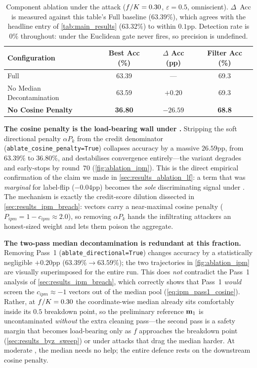 \documentclass[../main.tex]{subfiles}
\begin{document}
\begin{table}[htbp]
\centering
\caption[Component ablation under the \ipm{} attack ($f/\nclients=0.30$, $\varepsilon=0.5$)]{Component ablation under the \ipm{} attack ($f/\nclients=0.30$, $\varepsilon=0.5$, omniscient). $\Delta$~Acc is measured against this table's Full \aegis{} baseline ($63.39\%$), which agrees with the headline \ipm{} entry of \cref{tab:main_results} ($63.32\%$) to within $0.1$pp. Detection rate is $0\%$ throughout: under \ipm{} the Euclidean gate never fires, so precision is undefined.}
\label{tab:ablation_ipm}
\begin{tabular}{lccc}
\toprule
\textbf{Configuration} & \textbf{Best Acc (\%)} & \textbf{$\Delta$ Acc (pp)} & \textbf{Filter Acc (\%)} \\
\midrule
Full \aegis{}             & 63.39 & ---     & 69.3 \\
No Median Decontamination & 63.59 & $+0.20$ & 69.3 \\
\textbf{No Cosine Penalty} & \textbf{36.80} & $\mathbf{-26.59}$ & \textbf{68.8} \\
\bottomrule
\end{tabular}
\end{table}

\textbf{The cosine penalty is the load-bearing wall under \ipm{}.}
Stripping the soft directional penalty $\alpha P_k$ from the credit denominator (\texttt{ablate\_cosine\_penalty=True}) collapses accuracy by a massive $26.59$pp, from $63.39\%$ to $36.80\%$, and destabilises convergence entirely---the variant degrades and early-stops by round~$70$ (\cref{fig:ablation_ipm}). This is the direct empirical confirmation of the claim we made in \cref{sec:results_ablation_lf}: a term that was \emph{marginal} for label-flip ($-0.04$pp) becomes the \emph{sole} discriminating signal under \ipm{}. The mechanism is exactly the credit-score dilution dissected in \cref{sec:results_ipm_breach}: \ipm{} vectors carry a near-maximal cosine penalty ($P_{ipm} = 1 - c_{ipm} \approx 2.0$), so removing $\alpha P_k$ hands the infiltrating attackers an honest-sized weight and lets them poison the aggregate.

\textbf{The two-pass median decontamination is redundant at this fraction.}
Removing Pass~1 (\texttt{ablate\_directional=True}) changes accuracy by a statistically negligible $+0.20$pp ($63.39\% \to 63.59\%$); the two trajectories in \cref{fig:ablation_ipm} are visually superimposed for the entire run. This does \emph{not} contradict the Pass~1 analysis of \cref{sec:results_ipm_breach}, which correctly shows that Pass~1 \emph{would} screen the $c_{ipm}\approx-1$ vectors out of the median pool (\cref{eq:ipm_pass1_cosine}). Rather, at $f/\nclients=0.30$ the coordinate-wise median already sits comfortably inside its $0.5$ breakdown point, so the preliminary reference $\mathbf{m}_{1}$ is uncontaminated \emph{without} the extra cleaning pass---the second pass is a safety margin that becomes load-bearing only as $f$ approaches the breakdown point (\cref{sec:results_byz_sweep}) or under attacks that drag the median harder. At moderate \ipm{}, the median needs no help; the entire defence rests on the downstream cosine penalty.
\end{document}
